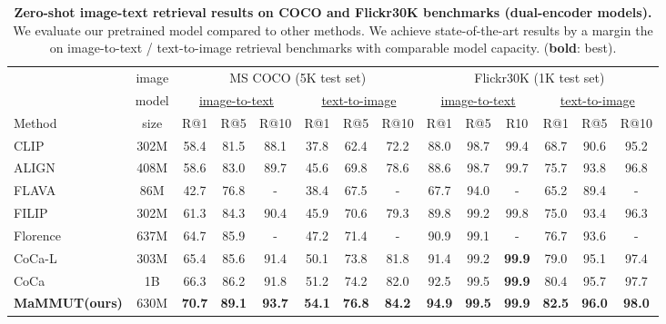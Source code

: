 \documentclass[10pt]{article} \usepackage[accepted]{tmlr}
\newcommand{\tablestyle}[2]{\setlength{\tabcolsep}{#1}\renewcommand{\arraystretch}{#2}\centering\footnotesize}
\newcommand{\white}[1]{\color[HTML]{FFFFFF}{{#1}}}
\newcommand{\ours}{MaMMUT\xspace}
\begin{document}
\begin{table*}[t]
\centering
\small
\tablestyle{5pt}{1.1}
\begin{tabular}{l|c|cccccc|cccccc}
&  image & 
\multicolumn{6}{c|}{MS COCO (5K test set)} & \multicolumn{6}{c}{Flickr30K (1K test set)} \\
& model & \multicolumn{3}{c}{\underline{{\white{-------}}image-to-text{\white{-------}}}} & \multicolumn{3}{c|}{\underline{{\white{-------}}text-to-image{\white{-------}}}} & \multicolumn{3}{c}{\underline{{\white{-------}}image-to-text{\white{-------}}}} & \multicolumn{3}{c}{\underline{{\white{-------}}text-to-image{\white{-------}}}} \\
Method & size      & R@1  & R@5  & R@10 & R@1  & R@5   & R@10      & R@1  & R@5  & R10 & R@1  & R@5 & R@10    \\
\hline
CLIP~\citep{radford2021clip}   & 302M
& 58.4 & 81.5 & 88.1 & 37.8 & 62.4 & 72.2       & 88.0 & 98.7 & 99.4 & 68.7 & 90.6 & 95.2        \\
ALIGN~\citep{align}   & 408M
& 58.6 & 83.0 & 89.7 & 45.6 & 69.8 & 78.6       & 88.6 & 98.7 & 99.7 & 75.7 & 93.8 & 96.8        \\
FLAVA~\citep{singh2022flava}   & 86M
& 42.7 & 76.8 & - & 38.4 & 67.5 & -             & 67.7 & 94.0 & - & 65.2 & 89.4 & - \\
FILIP~\citep{yao2021filip}   & 302M
& 61.3 & 84.3 & 90.4 & 45.9 & 70.6 & 79.3       & 89.8 & 99.2 & 99.8 & 75.0 & 93.4 & 96.3        \\
Florence~\citep{yuan2021florence} & 637M
& 64.7 & 85.9 & - & 47.2&  71.4&  -             & 90.9 & 99.1 & - & 76.7 & 93.6 & -             \\
CoCa-L~\citep{yu2022coca} & 303M
& 65.4 & 85.6 & 91.4&  50.1 & 73.8 & 81.8          & 91.4 & 99.2 & \bf{99.9} & 79.0& 95.1 & 97.4   \\
CoCa~\citep{yu2022coca} & 1B
& 66.3 & 86.2 & 91.8 & 51.2 & 74.2 & 82.0          & 92.5 & 99.5 & \bf{99.9} & 80.4 & 95.7 & 97.7 \\
\hline
\bf{\ours (ours)}   & 630M  & \bf{70.7}  & \bf{89.1}  & \bf{93.7}  & \bf{54.1}  & \bf{76.8}  & \bf{84.2}
        & \bf{94.9}  & \bf{99.5}  & \bf{99.9}   & \bf{82.5}  & \bf{96.0}  & \bf{98.0}  \\
\hline
\end{tabular}
\vspace{-1mm}
\caption{\textbf{Zero-shot image-text retrieval results on COCO and Flickr30K benchmarks (dual-encoder models).} We evaluate our pretrained model compared to other methods. We achieve state-of-the-art results by a margin the on image-to-text / text-to-image retrieval benchmarks with comparable model capacity. (\textbf{bold}: best).}
\label{tab:retrieval_sota}
\vspace{-2mm}
\end{table*}
\end{document}
